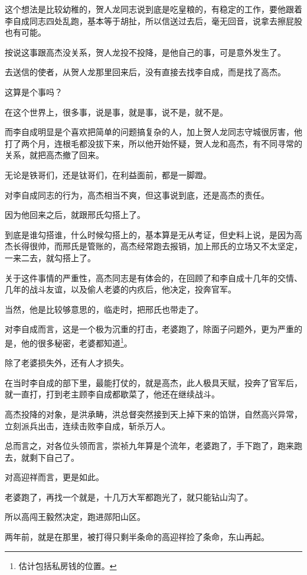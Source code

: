 \begin{multicols}{\theparacolNo}
		这个想法是比较幼稚的，贺人龙同志说到底是吃皇粮的，有稳定的工作，要他跟着李自成同志四处乱跑，基本等于胡扯，所以信送过去后，毫无回音，说拿去擦屁股也有可能。

		按说这事跟高杰没关系，贺人龙投不投降，是他自己的事，可是意外发生了。

		去送信的使者，从贺人龙那里回来后，没有直接去找李自成，而是找了高杰。

		这算是个事吗？

		在这个世界上，很多事，说是事，就是事，说不是，就不是。

		而李自成明显是个喜欢把简单的问题搞复杂的人，加上贺人龙同志守城很厉害，他打了两个月，连根毛都没拔下来，所以他开始怀疑，贺人龙和高杰，有不同寻常的关系，就把高杰撤了回来。

		无论是铁哥们，还是钛哥们，在利益面前，都是一脚蹬。

		对李自成同志的行为，高杰相当不爽，但这事说到底，还是高杰的责任。

		因为他回来之后，就跟邢氏勾搭上了。

		到底是谁勾搭谁，什么时候勾搭上的，基本算是无从考证，但史料上说，是因为高杰长得很帅，而邢氏是管账的，高杰经常跑去报销，加上邢氏的立场又不太坚定，一来二去，就勾搭上了。

		关于这件事情的严重性，高杰同志是有体会的，在回顾了和李自成十几年的交情、几年的战斗友谊，以及偷人老婆的内疚后，他决定，投奔官军。

		当然，他是比较够意思的，临走时，把邢氏也带走了。

		对李自成而言，这是一个极为沉重的打击，老婆跑了，除面子问题外，更为严重的是，他的很多秘密，老婆都知道\footnote{估计包括私房钱的位置。}。

		除了老婆损失外，还有人才损失。

		在当时李自成的部下里，最能打仗的，就是高杰，此人极具天赋，投奔了官军后，就一直打，打到老主顾李自成都歇菜了，他还在继续战斗。

		高杰投降的对象，是洪承畴，洪总督突然接到天上掉下来的馅饼，自然高兴异常，立刻派兵出击，连续击败李自成，斩杀万人。

		总而言之，对各位头领而言，崇祯九年算是个流年，老婆跑了，手下跑了，跑来跑去，就剩下自己了。

		对高迎祥而言，更是如此。

		老婆跑了，再找一个就是，十几万大军都跑光了，就只能钻山沟了。

		所以高闯王毅然决定，跑进郧阳山区。

		两年前，就是在那里，被打得只剩半条命的高迎祥捡了条命，东山再起。


\end{multicols}
